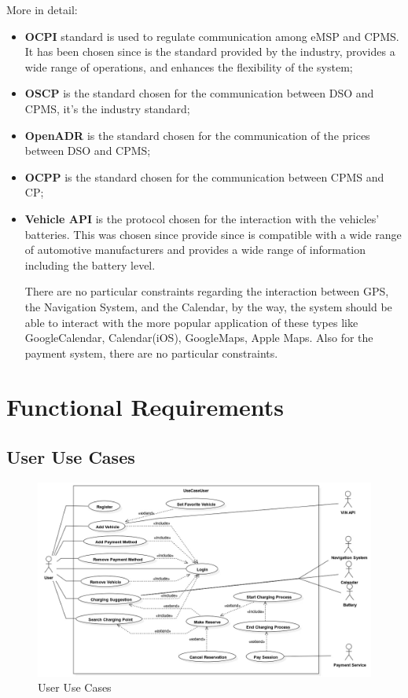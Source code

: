 \documentclass{Configuration_Files/PoliMi3i_thesis}
\begin{document}
More in detail: 
\begin{itemize}
    \item \textbf{OCPI} standard is used to regulate communication among eMSP and CPMS. It has been chosen since is the standard provided by the industry, provides a wide range of operations, and enhances the flexibility of the system;
    \item \textbf{OSCP} is the standard chosen for the communication between  DSO and CPMS, it's the industry standard;
    \item \textbf{OpenADR} is the standard chosen for the communication of the prices between DSO and CPMS;
    \item \textbf{OCPP} is the standard chosen for  the communication between CPMS and CP;
    \item \textbf{Vehicle API} is the protocol chosen for the interaction with the vehicles' batteries. This was chosen since provide since is compatible with a wide range of automotive manufacturers and provides a wide range of information including the battery level.

There are no particular constraints regarding the interaction between GPS, the Navigation System, and the Calendar, by the way, the system should be able to interact with the more popular application of these types like GoogleCalendar, Calendar(iOS), GoogleMaps, Apple Maps.
Also for the payment system, there are no particular constraints.

\end{itemize}


\section{Functional Requirements}

\subsection{User Use Cases}
\begin{figure}[H]
    \centering
    \includegraphics[width=1\textwidth]{Images/UseCases/UserUseCases.jpg}
    \caption{User Use Cases}
\end{figure}
\end{document}
